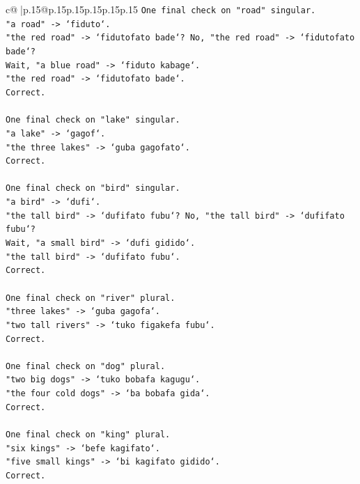 \documentclass{article}
\begin{document}
{\begin{supertabular}{c@{$\;$}|p{.15\linewidth}@{}p{.15\linewidth}p{.15\linewidth}p{.15\linewidth}p{.15\linewidth}p{.15\linewidth}}
{{{\texttt{One final check on "road" singular.} \\
\texttt{"a road" {-}> `fiduto`.} \\
\texttt{"the red road" {-}> `fidutofato bade`? No, "the red road" {-}> `fidutofato bade`?} \\
\texttt{Wait, "a blue road" {-}> `fiduto kabage`.} \\
\texttt{"the red road" {-}> `fidutofato bade`.} \\
\texttt{Correct.} \\
\\ 
\texttt{One final check on "lake" singular.} \\
\texttt{"a lake" {-}> `gagof`.} \\
\texttt{"the three lakes" {-}> `guba gagofato`.} \\
\texttt{Correct.} \\
\\ 
\texttt{One final check on "bird" singular.} \\
\texttt{"a bird" {-}> `dufi`.} \\
\texttt{"the tall bird" {-}> `dufifato fubu`? No, "the tall bird" {-}> `dufifato fubu`?} \\
\texttt{Wait, "a small bird" {-}> `dufi gidido`.} \\
\texttt{"the tall bird" {-}> `dufifato fubu`.} \\
\texttt{Correct.} \\
\\ 
\texttt{One final check on "river" plural.} \\
\texttt{"three lakes" {-}> `guba gagofa`.} \\
\texttt{"two tall rivers" {-}> `tuko figakefa fubu`.} \\
\texttt{Correct.} \\
\\ 
\texttt{One final check on "dog" plural.} \\
\texttt{"two big dogs" {-}> `tuko bobafa kagugu`.} \\
\texttt{"the four cold dogs" {-}> `ba bobafa gida`.} \\
\texttt{Correct.} \\
\\ 
\texttt{One final check on "king" plural.} \\
\texttt{"six kings" {-}> `befe kagifato`.} \\
\texttt{"five small kings" {-}> `bi kagifato gidido`.} \\
\texttt{Correct.} \\
}}}
\end{supertabular}}
\end{document}
